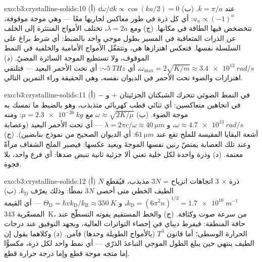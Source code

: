 \begin{solution}{exo:b3:crystalline-solids:10}
(أ) $\dd\omega/\dd k \propto \cos(ka/2) = 0$ عند $k = \pi/a$. (ب)
$u_n \propto (-1)^n$: أي كل ذرة في طور معاكس لجاريها
معًا --- وهي موجة موقوفة، تتخضخض فيها الطاقة في مكانها. (ج)
ومع $\lambda = 2a$، تختلف الأمواج المنتثرة إلى الخلف عن الذرات
المتعاقبة في المسير بطول موجي واحد بالضبط: أي شرط براغ
على السلسلة نفسها. فتعكس  اهتزازها هي،
وتتقفّل الأمواج الأمامية والخلفية في النمط الموقوف، ولا
تستطيع الموجة السائرة المضيّ. (د) $\omega_{\text{max}} = 2\sqrt{K/m} \approx
\qty{3.4e13}{rad/s}$، أي $\sim\qty{5}{THz}$: أي تحت الأحمر البعيد
--- فتلتقي اهتزازات  والضوء تحت الأحمر في الديوان نفسه،
وهي الحقيقة وراء التمرين التالي.
\end{solution}

\begin{solution}{exo:b3:crystalline-solids:11}
(أ) في النمط الضوئي تتحرك الشبكتان الجزئيتان $+$ و $-$ في اتجاهين
متعاكسين: أي ثنائي قطب كهربائي متذبذب، وهو بالضبط ما تمسك به موجة الضوء.
(ب) $\omega \approx \sqrt{2K/\mu}$ مع $\mu =
\qty{2.3e-26}{kg}$: ومنه $\omega \approx \qty{4.7e13}{rad/s}$، و
$\lambda = 2\pi c/\omega \approx \qty{40}{\micro m}$ --- أي تحت الأحمر
البعيد (وعصابة أشعة البقايا المقيسة للملح تقع عند
$\qty{61}{\micro m}$: أي الديوان الصحيح من نموذج بنابضين). (ج)
وعند تلك العصابة يمتصّ رنين  نفسها الموجةَ ويعيد عكسها:
فيصير الملح الشفاف مرآةً معتمة. (د) وذرة واحدة لكل
خلية تعني ألا  جزئية ثانية تنبض ضدها: أي فرع واحد،
بلا فجوة.
\end{solution}

\begin{solution}{exo:b3:crystalline-solids:12}
(أ) $N$ ذرة $\times$ 3 اتجاهات انزياح = $3N$
مذبذب، فيُقطع الطيف الخطي متى
أحصى $3N$ نمطًا: وذلك يعرّف $k_{\text{D}}$. (ب)
$k_{\text{D}} = (6\pi^2n)^{1/3} = \qty{1.7e10}{m^{-1}}$، و
$\Theta_{\text{D}} = \hbar vk_{\text{D}}/k_{\text{B}} \approx
\qty{350}{K}$ --- أي القيمة المسعّرية \qty{343}{K}، من سرعة
صوت وكثافة. (ج) والخط المستقيم يفوته التسطّح
عند حافة المنطقة: فيفرط ديباي في إحصاء التواترات العالية، ويجهد
التوفيق عند درجات الحرارة الوسطى؛ أما قانون $T^3$ (بالأمواج الطويلة
وحدها) فآمن. (د) وكلاهما يقول إن الطيف ينتهي حين يبلغ الطول الموجي
التباعدَ الذرّي --- أي نمط واحد لكل ذرة، مكسوًّا إما
متجه موجة قطع وإما درجة حرارة قطع.
\end{solution}

